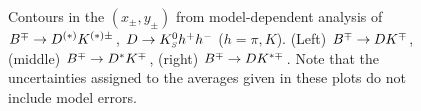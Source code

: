 \begin{figure}[htb]
\begin{center}
{    }
    \hfill
  \end{center}
  \vspace{-0.5cm}
  \caption{
    Contours in the $(x_\pm, y_\pm)$ from model-dependent analysis of $B^\mp \to D^{(*)}K^{(*)\pm}$, $D \to K^0_{\scriptscriptstyle S} h^+ h^-$ ($h = \pi,K$).
    (Left) $B^\mp \to DK^\mp$, 
    (middle) $B^\mp \to D^*K^\mp$,
    (right) $B^\mp \to DK^{*\mp}$.
    Note that the uncertainties assigned to the averages given in these plots
    do not include model errors.        
  }
  \label{fig:cp_uta:cus:dalitz_2d}
\end{figure}

